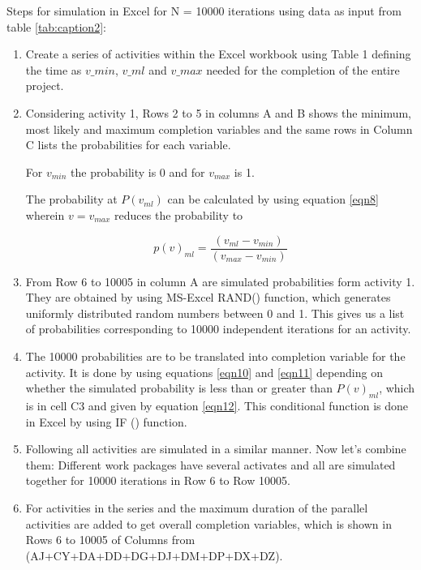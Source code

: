 Steps for simulation in Excel for N = 10000 iterations using data as input from table \ref{tab:caption2}:

\begin{enumerate}
	\item Create a series of activities within the Excel workbook \cite{Github} using Table 1 defining the time as $v\_min$, $v\_ml$ and $v\_max$ needed for the completion of the entire project.
	
	\item Considering activity 1, Rows 2 to 5 in columns A and B shows the minimum, most likely and maximum completion variables and the same rows in Column C lists the probabilities for each variable.
	
	For $v_ {min} $ the probability is 0 and for $v_ {max} $ is 1. 
	
	The probability at $P (v_ {ml}) $ can be calculated by using equation \ref{eqn8} wherein $v = v_ {max} $ reduces the probability to 
	
	\begin{equation}
	p(v)_{ml}  = \frac{(v_{ml} - v_{min})}{  (v_{max} - v_{min}) } 
	\label{eqn5.1}
	\end{equation}
	
	\item From Row 6 to 10005 in column A are simulated probabilities form activity 1. They are obtained by using MS-Excel RAND() function, which generates uniformly distributed random numbers between 0 and 1. This gives us a list of probabilities corresponding to 10000 independent iterations for an activity.
	
	\item The 10000 probabilities are to be translated into completion variable for the activity. It is done by using equations \ref{eqn10} and \ref{eqn11} depending on whether the simulated probability is less than or greater than $P(v)_ {ml}$, which is in cell C3 and given by equation \ref{eqn12}. This conditional function is done in Excel by using IF () function.
	
	\item Following all activities are simulated in a similar manner. Now let's combine them: Different work packages have several activates and all are simulated together for 10000 iterations in Row 6 to Row 10005.
	
	\item For activities in the series and the maximum duration of the parallel activities are added to get overall completion variables, which is shown in Rows 6 to 10005 of Columns from (AJ+CY+DA+DD+DG+DJ+DM+DP+DX+DZ).
	

\end{enumerate}
